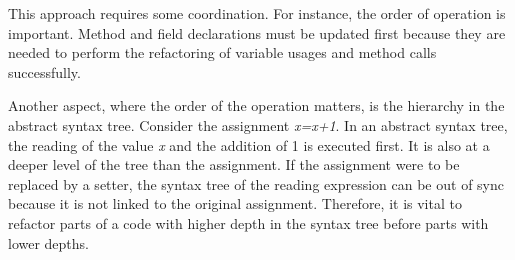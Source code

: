 This approach requires some coordination. For instance, the order of operation is important. Method and field declarations must be updated first because they are needed to perform the refactoring of variable usages and method calls successfully. 

Another aspect, where the order of the operation matters, is the hierarchy in the abstract syntax tree. Consider the assignment \textit{x=x+1}. In an abstract syntax tree, the reading of the value \textit{x} and the addition of 1 is executed first. It is also at a deeper level of the tree than the assignment. If the assignment were to be replaced by a setter, the syntax tree of the reading expression can be out of sync because it is not linked to the original assignment. Therefore, it is vital to refactor parts of a code with higher depth in the syntax tree before parts with lower depths. 
